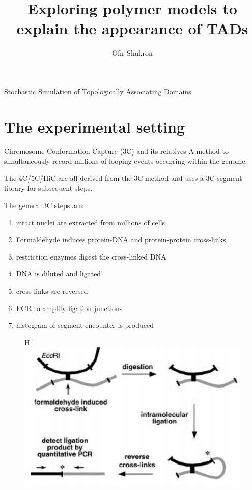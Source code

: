 \documentclass[8pt]{beamer}
\title{Exploring polymer models to explain the appearance of TADs}
\author{Ofir Shukron}
\institute{Ecole Normale Superieure}
\begin{document}
\begin{frame}{Stochastic Simulation of Topologically Associating Domains}
\titlepage
\end{frame}
\tableofcontents

\section{The experimental setting}
\begin{frame}{Chromosome Conformation Capture (3C) and its relatives}
A method to simultaneously record millions of looping events occurring within the genome. 

The 4C/5C/HiC are all derived from the 3C method and uses a 3C segment library for subsequent steps.

The general 3C steps are:
\begin{enumerate}
\item intact nuclei are extracted from millions of cells 
\item Formaldehyde induces protein-DNA and protein-protein cross-links
\item restriction enzymes digest the cross-linked DNA
\item DNA is diluted and ligated
\item cross-links are reversed
\item PCR to amplify ligation junctions
\item histogram of segment encounter is produced
\end{enumerate}
\begin{figure}{H}
\includegraphics[scale=0.3]{3Cschematic}
\end{figure}
 
\end{frame}
\end{document}

